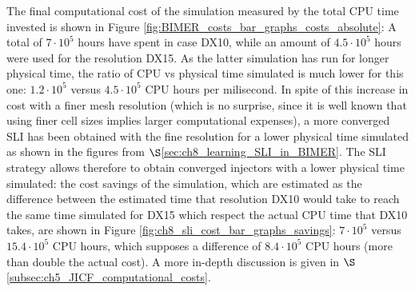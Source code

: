 The final computational cost of the simulation measured by the total CPU time invested is shown in Figure \ref{fig:BIMER_costs_bar_graphs_costs_absolute}: A total of $7 \cdot 10^5$ hours have spent in case DX10, while an amount of $4.5 \cdot 10^5$ hours were used for the resolution DX15. As the latter simulation has run for longer physical time, the ratio of CPU vs physical time simulated is much lower for this one: $1.2 \cdot 10^5$ versus $4.5 \cdot 10^5$ CPU hours per milisecond. In spite of this increase in cost with a finer mesh resolution (which is no surprise, since it is well known that using finer cell sizes implies larger computational expenses), a more converged SLI has been obtained with the fine resolution for a lower physical time simulated as shown in the figures from $\S$\ref{sec:ch8_learning_SLI_in_BIMER}. The SLI strategy allows therefore to obtain converged injectors with a lower physical time simulated: the cost savings of the simulation, which are estimated as the difference between the estimated time that resolution DX10 would take to reach the same time simulated for DX15 which respect the actual CPU time that DX10 takes, are shown in Figure \ref{fig:ch8_sli_cost_bar_graphs_savings}: $7 \cdot 10^5$ versus $15.4 \cdot 10^5$ CPU hours, which supposes a difference of $8.4 \cdot 10^5$ CPU hours (more than double the actual cost). A more in-depth discussion is given in $\S$\ref{subsec:ch5_JICF_computational_costs}. 


\clearpage

